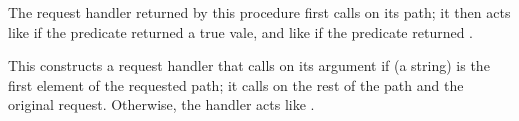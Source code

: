 \begin{desc}
  The request handler returned by this procedure first calls
   on its path; it then acts like  if the
  predicate returned a true vale, and like  if
  the predicate returned \sharpf.
\end{desc}

\begin{desc}
  This constructs a request handler that calls  on its
  argument if  (a string) is the first element of the
  requested path; it calls  on the rest of the path and
  the original request.  Otherwise, the handler acts like
  .
\end{desc}

